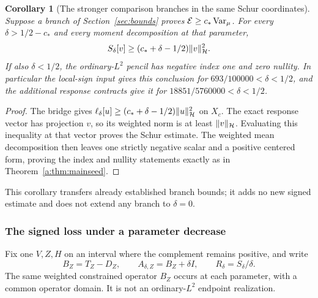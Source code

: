 \documentclass[11pt,a4paper]{article}
\numberwithin{equation}{section}
\newtheorem{corollary}[theorem]{Corollary}
\theoremstyle{definition}\newtheorem{definition}[theorem]{Definition}
\theoremstyle{remark}\newtheorem{remark}[theorem]{Remark}
\newcommand{\E}{\mathcal E}\newcommand{\D}{\mathcal D}
\newcommand{\Hh}{\mathcal H}\newcommand{\Hw}{\mathcal H}
\begin{document}
\begin{corollary}[The stronger comparison branches in the same Schur coordinates]\label{cor:stronger-schur}
Suppose a branch of Section~\ref{sec:bounds} proves $\E\ge c_*\Var_\mu$. For every $\delta>1/2-c_*$ and every moment decomposition at that parameter,
\[
 S_\delta[v]\ge(c_*+\delta-1/2)\norm v_{\Hh}^2.
\]
If also $\delta<1/2$, the ordinary-$L^2$ pencil has negative index one and zero nullity. In particular the local-sign input gives this conclusion for $693/100000<\delta<1/2$, and the additional response contracts give it for $18851/5760000<\delta<1/2$.
\end{corollary}
\begin{proof}
The bridge gives $\ell_\delta[u]\ge(c_*+\delta-1/2)\norm u_{\Hh}^2$ on $X_c$. The exact response vector has projection $v$, so its weighted norm is at least $\norm v_{\Hh}$. Evaluating this inequality at that vector proves the Schur estimate. The weighted mean decomposition then leaves one strictly negative scalar and a positive centered form, proving the index and nullity statements exactly as in Theorem~\ref{a:thm:mainseed}.
\end{proof}
This corollary transfers already established branch bounds; it adds no new signed estimate and does not extend any branch to $\delta=0$.

\subsubsection{The signed loss under a parameter decrease}

Fix one $V,Z,H$ on an interval where the complement remains positive, and write
\begin{equation}\label{a:eq:renormalized}
 B_Z=T_Z-D_Z,\qquad A_{\delta,Z}=B_Z+\delta I,
 \qquad R_\delta=S_\delta/\delta.
\end{equation}
The same weighted constrained operator $B_Z$ occurs at each parameter, with a common operator domain. It is not an ordinary-$L^2$ endpoint realization.
\end{document}
